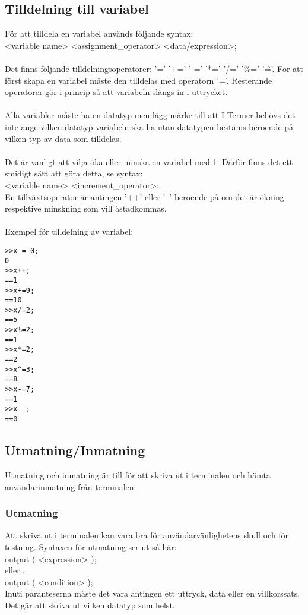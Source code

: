 \documentclass{TDP003mall}
\begin{document}
\subsection{Tilldelning till variabel}
För att tilldela en variabel används följande syntax:
\\
<variable name> <assignment\_operator> <data/expression>;
\\\\
Det finns följande tilldelningsoperatorer: '=' '+=' '-=' '*=' '/=' '\%=' '\^='. För att först skapa en variabel måste den tilldelas med operatorn '='. Resterande operatorer gör i princip så att variabeln slängs in i uttrycket.
\\\\
Alla variabler måste ha en datatyp men lägg märke till att I Termer behövs det inte ange vilken datatyp variabeln ska ha utan datatypen bestäms beroende på vilken typ av data som tilldelas.
\\\\
Det är vanligt att vilja öka eller minska en variabel med 1. Därför finns det ett smidigt sätt att göra detta, se syntax:
\\
<variable name> <increment\_operator>;
\\
En tillväxtsoperator är antingen '++' eller '--' beroende på om det är ökning respektive minskning som vill åstadkommas.
\\\\
Exempel för tilldelning av variabel:
\begin{lstlisting}
>>x = 0;
0
>>x++;
==1
>>x+=9;
==10
>>x/=2;
==5
>>x%=2;
==1
>>x*=2;
==2
>>x^=3;
==8
>>x-=7;
==1
>>x--;
==0
\end{lstlisting}

\subsection{Utmatning/Inmatning}
Utmatning och inmatning är till för att skriva ut i terminalen och hämta användarinmatning från terminalen.
\subsubsection{Utmatning}
Att skriva ut i terminalen kan vara bra för användarvänlighetens skull och för testning. Syntaxen för utmatning ser ut så här:
\\
output ( <expression> );\\
eller...\\
output ( <condition> );
\\
Inuti paranteserna måste det vara antingen ett uttryck, data eller en villkorssats. Det går att skriva ut vilken datatyp som helst.
\end{document}
